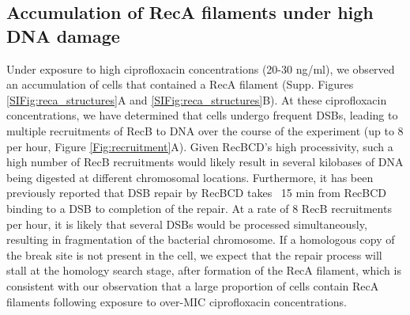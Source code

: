 \subsection*{Accumulation of RecA filaments under high DNA damage}
Under exposure to high ciprofloxacin concentrations (20-30 ng/ml), we observed an accumulation of cells that contained a RecA filament (Supp. Figures \ref{SIFig:reca_structures}A and \ref{SIFig:reca_structures}B). At these ciprofloxacin concentrations, we have determined that cells undergo frequent DSBs, leading to multiple recruitments of RecB to DNA over the course of the experiment (up to 8 per hour, Figure \ref{Fig:recruitment}A). Given RecBCD's high processivity\cite{Wiktor2018}, such a high number of RecB recruitments would likely result in several kilobases of DNA being digested at different chromosomal locations. Furthermore, it has been previously reported that DSB repair by RecBCD takes ~15 min from RecBCD binding to a DSB to completion of the repair\cite{Wiktor2021}. At a rate of 8 RecB recruitments per hour, it is likely that several DSBs would be processed simultaneously, resulting in fragmentation of the bacterial chromosome. If a homologous copy of the break site is not present in the cell, we expect that the repair process will stall at the homology search stage, after formation of the RecA filament, which is consistent with our observation that a large proportion of cells contain RecA filaments following exposure to over-MIC ciprofloxacin concentrations.
